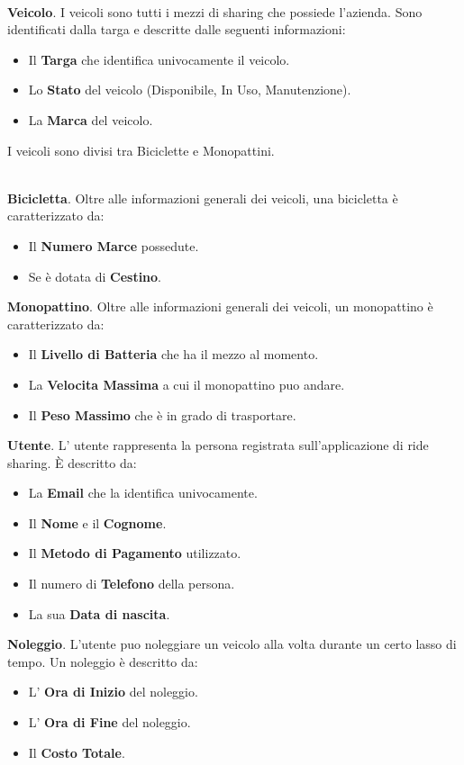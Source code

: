 \documentclass[11pt,a4paper]{article}
\newcommand{\invio}{\hspace{0pt}\\}
\begin{document}
\invio
\textbf{Veicolo}.
I veicoli sono tutti i mezzi di sharing che possiede l'azienda.
Sono identificati dalla targa e descritte dalle seguenti informazioni:
\begin{itemize}
    \item Il \textbf{Targa} che identifica univocamente il veicolo.
    \item Lo \textbf{Stato} del veicolo (Disponibile, In Uso, Manutenzione).
    \item La \textbf{Marca} del veicolo.
\end{itemize}
I veicoli sono divisi tra Biciclette e Monopattini.

\invio
\textbf{Bicicletta}.
Oltre alle informazioni generali dei veicoli, una bicicletta è caratterizzato da:
\begin{itemize}
    \item Il \textbf{Numero Marce} possedute.
    \item Se è dotata di \textbf{Cestino}.
\end{itemize}

\textbf{Monopattino}.
Oltre alle informazioni generali dei veicoli, un monopattino è caratterizzato da:
\begin{itemize}
    \item Il \textbf{Livello di Batteria} che ha il mezzo al momento.
    \item La \textbf{Velocita Massima} a cui il monopattino puo andare.
    \item Il \textbf{Peso Massimo} che è in grado di trasportare.
\end{itemize}

\textbf{Utente}.
L' utente rappresenta la persona registrata sull'applicazione di ride sharing.
È descritto da:
\begin{itemize}
    \item La \textbf{Email} che la identifica univocamente.
    \item Il \textbf{Nome} e il \textbf{Cognome}.
    \item Il \textbf{Metodo di Pagamento} utilizzato.
    \item Il numero di \textbf{Telefono} della persona.
    \item La sua \textbf{Data di nascita}.
\end{itemize}

\textbf{Noleggio}.
L'utente puo noleggiare un veicolo alla volta durante un certo lasso di tempo.
Un noleggio è descritto da:
\begin{itemize}
    \item L' \textbf{Ora di Inizio} del noleggio.
    \item L' \textbf{Ora di Fine} del noleggio.
    \item Il \textbf{Costo Totale}.
\end{itemize}
\end{document}
